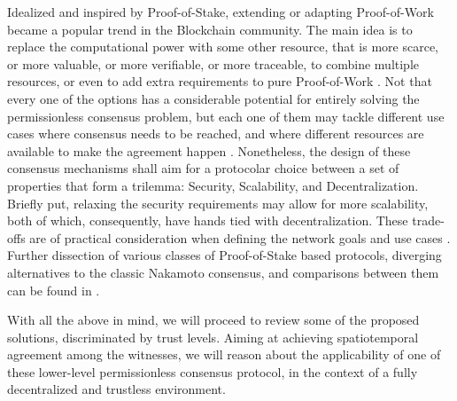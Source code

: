 Idealized and inspired by Proof-of-Stake, extending or adapting Proof-of-Work became a popular trend in the Blockchain community. The main idea is to replace the computational power with some other resource, that is more scarce, or more valuable, or more verifiable, or more traceable, to combine multiple resources, or even to add extra requirements to pure Proof-of-Work \cite{survey-dist-consensus}. Not that every one of the options has a considerable potential for entirely solving the permissionless consensus problem, but each one of them may tackle different use cases where consensus needs to be reached, and where different resources are available to make the agreement happen \cite{BOURAGA2021114384, 9376868}. Nonetheless, the design of these consensus mechanisms shall aim for a protocolar choice between a set of properties that form a trilemma: Security, Scalability, and Decentralization. Briefly put, relaxing the security requirements may allow for more scalability, both of which, consequently, have hands tied with decentralization. These trade-offs are of practical consideration when defining the network goals and use cases \cite{survey-dist-consensus}. Further dissection of various classes of Proof-of-Stake based protocols, diverging alternatives to the classic Nakamoto consensus, and comparisons between them can be found in \cite{8629877, survey-dist-consensus, BOURAGA2021114384, 9376868, natoli2019deconstructing}.

With all the above in mind, we will proceed to review some of the proposed \pol{} solutions, discriminated by trust levels. Aiming at achieving spatiotemporal agreement among the witnesses, we will reason about the applicability of one of these lower-level permissionless consensus protocol, in the context of a fully decentralized and trustless environment.